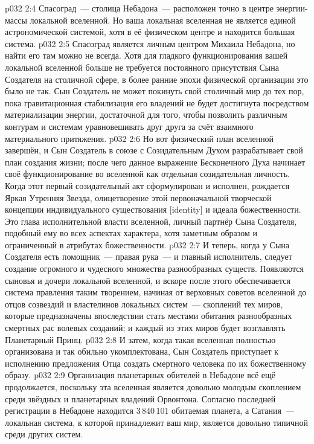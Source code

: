 \vs p032 2:4 Спасоград~--- столица Небадона~--- расположен точно в центре энергии\hyp{}массы локальной вселенной. Но ваша локальная вселенная не является единой астрономической системой, хотя в её физическом центре и находится большая система.
\vs p032 2:5 Спасоград является личным центром Михаила Небадона, но найти его там можно не всегда. Хотя для гладкого функционирования вашей локальной вселенной больше не требуется постоянного присутствия Сына Создателя на столичной сфере, в более ранние эпохи физической организации это было не так. Сын Создатель не может покинуть свой столичный мир до тех пор, пока гравитационная стабилизация его владений не будет достигнута посредством материализации энергии, достаточной для того, чтобы позволить различным контурам и системам уравновешивать друг друга за счёт взаимного материального притяжения.
\vs p032 2:6 \pc Но вот физический план вселенной завершён, и Сын Создатель в союзе с Созидательным Духом разрабатывает свой план создания жизни; после чего данное выражение Бесконечного Духа начинает своё функционирование во вселенной как отдельная созидательная личность. Когда этот первый созидательный акт сформулирован и исполнен, рождается Яркая Утренняя Звезда, олицетворение этой первоначальной творческой концепции индивидуального существования [identity] и идеала божественности. Это глава исполнительной власти вселенной, личный партнёр Сына Создателя, подобный ему во всех аспектах характера, хотя заметным образом и ограниченный в атрибутах божественности.
\vs p032 2:7 И теперь, когда у Сына Создателя есть помощник~--- правая рука~--- и главный исполнитель, следует создание огромного и чудесного множества разнообразных существ. Появляются сыновья и дочери локальной вселенной, и вскоре после этого обеспечивается система правления таким творением, начиная от верховных советов вселенной до отцов созвездий и властелинов локальных систем~--- скоплений тех миров, которые предназначены впоследствии стать местами обитания разнообразных смертных рас волевых созданий; и каждый из этих миров будет возглавлять Планетарный Принц.
\vs p032 2:8 И затем, когда такая вселенная полностью организована и так обильно укомплектована, Сын Создатель приступает к исполнению предложения Отца создать смертного человека по их божественному образу.
\vs p032 2:9 \pc Организация планетарных обителей в Небадоне всё ещё продолжается, поскольку эта вселенная является довольно молодым скоплением среди звёздных и планетарных владений Орвонтона. Согласно последней регистрации в Небадоне находится 3\,840\,101 обитаемая планета, а Сатания~--- локальная система, к которой принадлежит ваш мир, является довольно типичной среди других систем.
